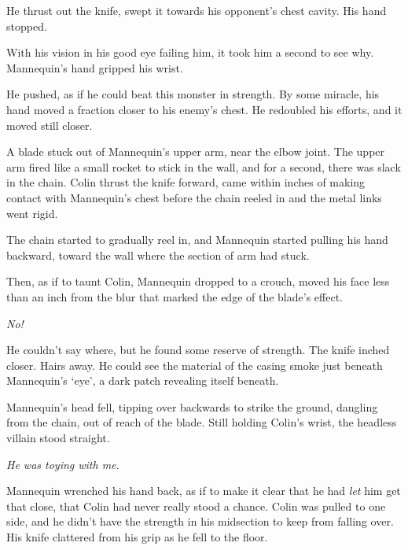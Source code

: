 He thrust out the knife, swept it towards his opponent's chest cavity.  His hand stopped.



With his vision in his good eye failing him, it took him a second to see why.  Mannequin's hand gripped his wrist.



He pushed, as if he could beat this monster in strength.  By some miracle, his hand moved a fraction closer to his enemy's chest.  He redoubled his efforts, and it moved still closer.



A blade stuck out of Mannequin's upper arm, near the elbow joint.  The upper arm fired like a small rocket to stick in the wall, and for a second, there was slack in the chain.  Colin thrust the knife forward, came within inches of making contact with Mannequin's chest before the chain reeled in and the metal links went rigid.



The chain started to gradually reel in, and Mannequin started pulling his hand backward, toward the wall where the section of arm had stuck.



Then, as if to taunt Colin, Mannequin dropped to a crouch, moved his face less than an inch from the blur that marked the edge of the blade's effect.



\emph{No!}



He couldn't say where, but he found some reserve of strength.  The knife inched closer.  Hairs away.  He could see the material of the casing smoke just beneath Mannequin's `eye', a dark patch revealing itself beneath.



Mannequin's head fell, tipping over backwards to strike the ground, dangling from the chain, out of reach of the blade.  Still holding Colin's wrist, the headless villain stood straight.



\emph{He was toying with me.}



Mannequin wrenched his hand back, as if to make it clear that he had \emph{let} him get that close, that Colin had never really stood a chance.  Colin was pulled to one side, and he didn't have the strength in his midsection to keep from falling over.  His knife clattered from his grip as he fell to the floor.




